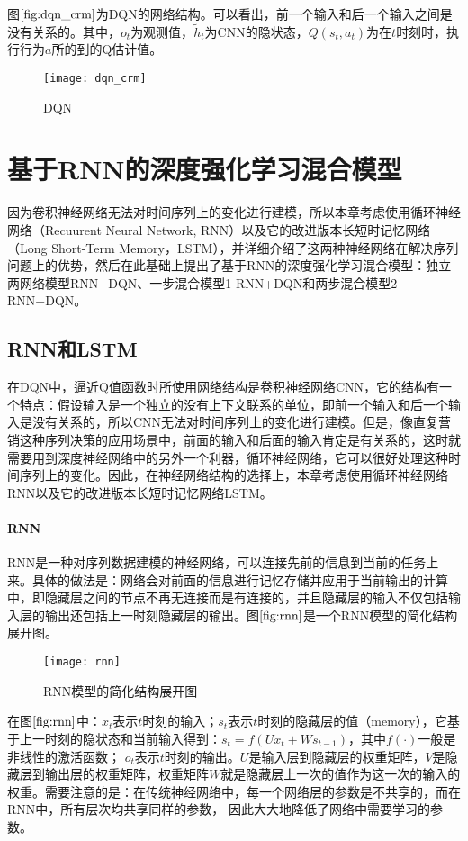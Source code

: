 图$\ref{fig:dqn_crm}$为DQN的网络结构。可以看出，前一个输入和后一个输入之间是没有关系的。其中，$o_{t}$为观测值，$\tilde{h}_{t}$为CNN的隐状态，$Q(s_{t},a_{t})$为在$t$时刻时，执行行为$a$所的到的Q估计值。

\begin{figure}[htbp]
\centering
\texttt{[image: dqn\_crm]}
\caption{DQN}
\label{fig:dqn_crm}
\end{figure}

\section{基于RNN的深度强化学习混合模型}
因为卷积神经网络无法对时间序列上的变化进行建模，所以本章考虑使用循环神经网络（Recuurent Neural Network, RNN）以及它的改进版本长短时记忆网络（Long  Short-Term Memory，LSTM），并详细介绍了这两种神经网络在解决序列问题上的优势，然后在此基础上提出了基于RNN的深度强化学习混合模型：独立两网络模型RNN+DQN、一步混合模型1-RNN+DQN和两步混合模型2-RNN+DQN。

\subsection{RNN和LSTM}
在DQN中，逼近Q值函数时所使用网络结构是卷积神经网络CNN，它的结构有一个特点：假设输入是一个独立的没有上下文联系的单位，即前一个输入和后一个输入是没有关系的，所以CNN无法对时间序列上的变化进行建模。但是，像直复营销这种序列决策的应用场景中，前面的输入和后面的输入肯定是有关系的，这时就需要用到深度神经网络中的另外一个利器，循环神经网络，它可以很好处理这种时间序列上的变化。因此，在神经网络结构的选择上，本章考虑使用循环神经网络RNN以及它的改进版本长短时记忆网络LSTM。

 \paragraph{RNN}
RNN是一种对序列数据建模的神经网络，可以连接先前的信息到当前的任务上来。具体的做法是：网络会对前面的信息进行记忆存储并应用于当前输出的计算中，即隐藏层之间的节点不再无连接而是有连接的，并且隐藏层的输入不仅包括输入层的输出还包括上一时刻隐藏层的输出。图$\ref{fig:rnn}$是一个RNN模型的简化结构展开图。
\begin{figure}[htbp]
\centering
\texttt{[image: rnn]}
\caption{RNN模型的简化结构展开图}
\label{fig:rnn}
\end{figure}

在图$\ref{fig:rnn}$中：$x_{t}$表示$t$时刻的输入；$s_{t}$表示$t$时刻的隐藏层的值（memory），它基于上一时刻的隐状态和当前输入得到：$s_t=f(U x_{t}+W s_{t−1})$，其中$f(\cdot)$一般是非线性的激活函数；
$o_{t}$表示$t$时刻的输出。$U$是输入层到隐藏层的权重矩阵，$V$是隐藏层到输出层的权重矩阵，权重矩阵$W$就是隐藏层上一次的值作为这一次的输入的权重。需要注意的是：在传统神经网络中，每一个网络层的参数是不共享的，而在RNN中，所有层次均共享同样的参数，
因此大大地降低了网络中需要学习的参数。

